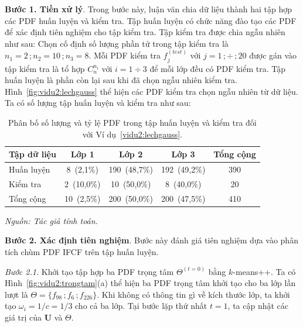 \documentclass[a4paper,oneside]{book} %
\theoremstyle{plain}
\theoremstyle{plain}
\theoremstyle{nonumberplain}
\begin{document}
\textbf{Bước 1. Tiền xử lý}. Trong bước này, luận văn chia dữ liệu thành hai tập hợp các PDF huấn luyện và kiểm tra. Tập huấn luyện có chức năng đào tạo các PDF để xác định tiên nghiệm cho tập kiểm tra. Tập kiểm tra được chia ngẫu nhiên như sau:
Chọn cố định số lượng phần tử trong tập kiểm tra là $n_1 = 2\,; n_2= 10\,; n_3 = 8$. Mỗi PDF kiểm tra $f^{(test)}_j$ với $j = 1\,;\div\,;20$ được gán vào tập kiểm tra là tổ hợp $C_{n}^{n_i}$ với $i=1\div 3$ để mỗi lớp đều có PDF kiểm tra. Tập huấn luyện là phần còn lại sau khi đã chọn ngẫu nhiên kiểm tra.  Hình~\ref{fig:vidu2:lechgauss} thể hiện các PDF kiểm tra chọn ngẫu nhiên từ dữ liệu. Ta có số lượng tập huấn luyện và kiểm tra như sau:

\begin{table}[H]
	\centering
	\fontsize{11pt}{14pt}\selectfont
	\caption{Phân bố số lượng và tỷ lệ PDF trong tập huấn luyện và kiểm tra đối với Ví dụ~\ref{vidu2:lechgauss}.}
	\begin{tabular*}{\columnwidth}{@{\extracolsep\fill}lcccc@{\extracolsep\fill}} 
		\toprule
		\textbf{Tập dữ liệu} & \textbf{Lớp 1} & \textbf{Lớp 2} & \textbf{Lớp 3} & \textbf{Tổng cộng} \\
		\midrule
		Huấn luyện 
		& 8~(2{,}1\%) 
		& 190~(48{,}7\%) 
		& 192~(49{,}2\%) 
		& 390 \\
		Kiểm tra   
		& 2~(10{,}0\%) 
		& 10~(50{,}0\%) 
		& 8~(40{,}0\%) 
		& 20 \\
		{Tổng cộng} 
		& {10~(2{,}5\%)} 
		& {200~(50{,}0\%)} 
		& {200~(47{,}5\%)} 
		& {410} \\
		\bottomrule
	\end{tabular*}
	\label{tab:phanbo_du_lieu}
	\begin{minipage}{\textwidth}
		\fontsize{11pt}{14pt}\selectfont\it
		Nguồn: Tác giả tính toán.
	\end{minipage}
\end{table}


\textbf{Bước 2. Xác định tiên nghiệm}. Bước này đánh giá tiên nghiệm dựa vào phân tích chùm PDF IFCF trên tập huấn luyện.

\textit{Bước 2.1.} Khởi tạo tập hợp ba PDF trọng tâm $\Theta^{(t=0)}$ bằng $k$-means++. Ta có Hình~\ref{fig:vidu2:trongtam}(a) thể hiện ba PDF trọng tâm khởi tạo cho ba lớp lần lượt là $\Theta =\{f_{98}\,; f_{6}\,;f_{226}\}$. Khi không có thông tin gì về kích thước lớp, ta khởi tạo $\omega_i=1/c=1/3$ cho cả ba lớp. Tại bước lặp thứ nhất $t=1$, ta cập nhật các giá trị của $\bm U$ và $\Theta$.
\end{document}
